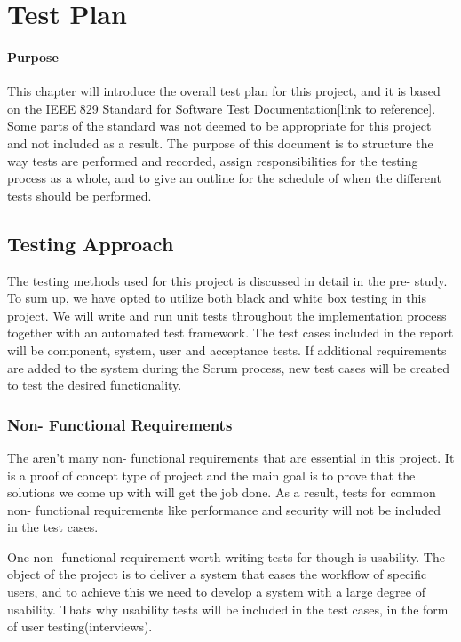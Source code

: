 \chapter{Test Plan}

\minitoc

\subsubsection{Purpose}

This chapter will introduce the overall test plan for this project, and it is based on the IEEE 829 Standard for Software Test Documentation[link to reference]. Some parts of the standard was not deemed to be appropriate for this project and not included as a result. The purpose of this document is to structure the way tests are performed and recorded, assign responsibilities for the testing process as a whole, and to give an outline for the schedule of when the different tests should be performed.

\clearpage

\section{Testing Approach}
The testing methods used for this project is discussed in detail in the pre- study. To sum up, we have opted to utilize both black and white box testing in this project. We will write and run unit tests throughout the implementation process together with an automated test framework. The test cases included in the report will be component, system, user and acceptance tests. If additional requirements are added to the system during the Scrum process, new test cases will be created to test the desired functionality.

\subsection{Non- Functional Requirements}
The aren’t many non- functional requirements that are essential in this project. It is a proof of concept type of project and the main goal is to prove that the solutions we come up with will get the job done. As a result, tests for common non- functional requirements like performance and security will not be included in the test cases. 

One non- functional requirement worth writing tests for though is usability. The object of the project is to deliver a system that eases the workflow of specific users, and to achieve this we need to develop a system with a large degree of usability. Thats why usability tests will be included in the test cases, in the form of user testing(interviews).

